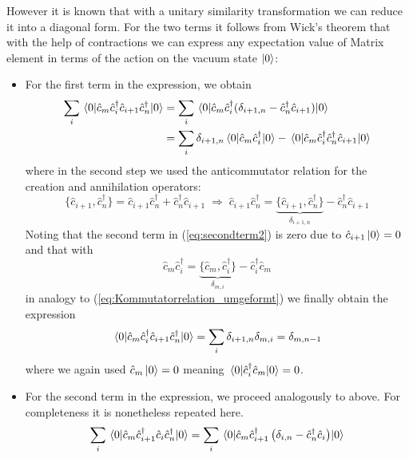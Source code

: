 \documentclass[11pt, a4paper]{article}
\theoremstyle{definition} %
\begin{document}
	
	 However it is known that with a unitary similarity transformation we can reduce it into a diagonal form. For the two terms it follows from Wick's theorem that with the help of contractions we can express any expectation value of Matrix element in terms of the action on the vacuum state $\ket{0}$:
	 \begin{itemize}
	 	\item For the first term in the expression, we obtain
	 	\begin{align}
	 		\sum_i \mel{0}{\hat{c}_m \hat{c}_{i}^\dagger \hat{c}_{i+1} \hat{c}_n^\dagger}{0} &= \sum_i \mel{0}{\hat{c}_m \hat{c}_i^\dagger (\delta_{i +1, n} - \hat{c}_n^\dagger\hat{c}_{i+1})}{0}\\
	 		 &= \sum_i \delta_{i+1, n} \mel{0}{\hat{c}_m \hat{c}_i^\dagger}{0} - \mel{0}{\hat{c}_m \hat{c}_i^\dagger \hat{c}_n^\dagger\hat{c}_{i+1}}{0}
	 		 \label{eq:secondterm2}
	 	\end{align}
	 	where in the second step we used the anticommutator relation for the creation and annihilation operators:
	 	\begin{equation}
	 		\{ \hat{c}_{i+1}, \hat{c}_n^\dagger \} = \hat{c}_{i+1} \hat{c}_n^\dagger + \hat{c}_n^\dagger\hat{c}_{i+1} \; \Rightarrow \; \hat{c}_{i+1} \hat{c}_n^\dagger = \underbrace{\{ \hat{c}_{i+1}, \hat{c}_n^\dagger \}}_{\delta_{i+1, n}} - \hat{c}_n^\dagger \hat{c}_{i+1}
	 		\label{eq:Kommutatorrelation_umgeformt}
	 	\end{equation}
	 	Noting that the second term in (\ref{eq:secondterm2}) is zero due to $\hat{c}_{i+1}\ket{0} =0$ and that with
	 	\begin{equation}
	 		\hat{c}_m \hat{c}_{i}^\dagger = \underbrace{\{ \hat{c}_m, \hat{c}_i^\dagger\}}_{\delta_{m, i}} - \hat{c}_i^\dagger \hat{c}_m
	 	\end{equation}
	 	in analogy to (\ref{eq:Kommutatorrelation_umgeformt}) we finally obtain the expression
	 	\begin{equation}
	 		\mel{0}{\hat{c}_m \hat{c}_i^\dagger \hat{c}_{i+1}\hat{c}_n^\dagger}{0} = \sum_i \delta_{i+1,n}\delta_{m, i} =\delta_{m, n-1}
	 		\label{eq:first_term_correlation_matrix}
	 	\end{equation}
	 	where we again used $\hat{c}_m \ket{0} = 0$ meaning $\mel{0}{\hat{c}_i^\dagger \hat{c}_m}{0} = 0$.
	 	 \item For the second term in the expression, we proceed analogously to above. For completeness it is nonetheless repeated here. \begin{align}
	 		\sum_i \mel{0}{\hat{c}_m \hat{c}_{i+1}^\dagger \hat{c}_{i} \hat{c}_n^\dagger}{0} &= \sum_i \mel{0}{\hat{c}_m \hat{c}_{i+1}^\dagger \left( \delta_{i,n} - \hat{c}_n^\dagger \hat{c}_i \right)}{0} \\

\end{align}
\end{itemize}
\end{document}
